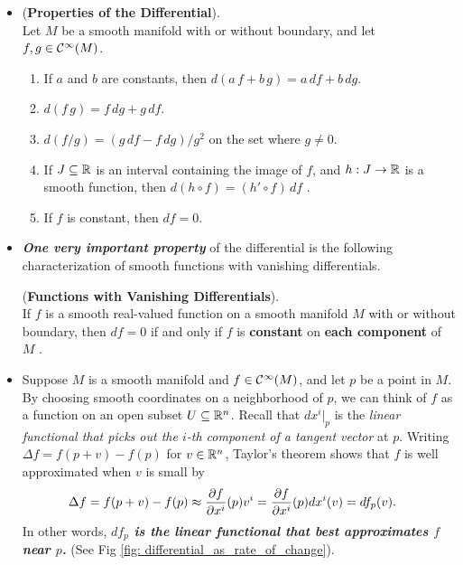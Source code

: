 \documentclass[11pt]{article}
\begin{document}
\begin{itemize}
\item \begin{proposition} (\textbf{Properties of the Differential}).\\
Let $M$ be a smooth manifold with or without boundary, and let $f, g \in {\mathcal C}^{\infty}(M)$.
\begin{enumerate}
\item If $a$ and $b$ are constants, then $d(a\,f + b\,g) = a\, df + b\, dg$.
\item $d (f\,g) = f\, dg + g\, df$.
\item $d (f / g) = (g\, df  - f\, dg) / g^2$ on the set where $g \neq 0$.
\item If $J \subseteq {\mathbb R}$ is an interval containing the image of $f$, and $h: J \rightarrow {\mathbb R}$ is a smooth function, then $d (h \circ f) = (h' \circ f) \,df$ .
\item If $f$ is constant, then $df = 0$.
\end{enumerate}
\end{proposition}

\item \emph{\textbf{One very important property}} of the differential is the following characterization of smooth functions with vanishing differentials.
\begin{proposition} (\textbf{Functions with Vanishing Differentials}). \citep{lee2003introduction} \\
If $f$ is a smooth real-valued function on a smooth manifold $M$ with or without boundary, then $df = 0$ if and only if $f$ is \textbf{constant} on \textbf{each component} of $M$ .
\end{proposition}


\item \begin{remark} Suppose $M$ is a smooth manifold and $f \in {\mathcal C}^{\infty}(M)$, and let $p$ be a point in $M$. By choosing smooth coordinates on a neighborhood of $p$, we can think of $f$ as a function on an open subset $U\subseteq {\mathbb R}^n$.  Recall that $dx^i |_p$ is the \emph{linear functional that picks out the $i$-th component of a tangent vector} at $p$.  Writing $\Delta f = f(p + v) - f(p)$ for $v\in {\mathbb R}^{n}$, Taylor’s theorem shows that $f$ is well approximated when $v$ is small by
\begin{align*}
\Delta f = f(p + v) -  f(p)  &\approx \frac{\partial f}{ \partial x^{i}}(p) v^{i} = \frac{\partial f}{ \partial x^{i}}(p) dx^{i}(v) = df_{p} (v).
\end{align*} In other words, \emph{\textbf{$df_p$ is the linear functional that best approximates $f$ near $p$.}} (See Fig \ref{fig: differential_as_rate_of_change}).


\end{remark}
\end{itemize}
\end{document}
